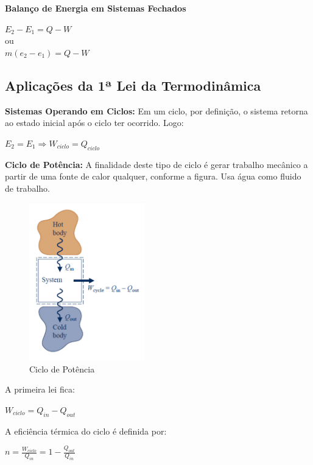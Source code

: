 \documentclass[a4paper, 12pt]{article}
\begin{document}
\textbf{Balanço de Energia em Sistemas Fechados}
	\begin{center}
		\large 
		$ E_{2} - E_{1} = Q - W $\\ ou\\
		$ m(e_{2} - e_{1}) = Q - W$
	\end{center}

\subsection{Aplicações da 1ª Lei da Termodinâmica}
\textbf{Sistemas Operando em Ciclos:}
Em um ciclo, por definição, o sistema retorna ao estado inicial após o ciclo ter
ocorrido. Logo:
	\begin{center}
		\large
		$ E_{2} = E_{1} \Rightarrow W_{ciclo} = Q_{ciclo}$
	\end{center}

\textbf{Ciclo de Potência:} A finalidade deste tipo de ciclo é gerar trabalho
mecânico a partir de uma fonte de calor qualquer,
conforme a figura. Usa água como fluido de trabalho.
	\begin{figure}[h]
		\includegraphics[width = 5cm]{cp.png}
		\centering
		\caption{Ciclo de Potência}
	\end{figure}

A primeira lei fica:
	\begin{center}
		\large
		$ W_{ciclo}  = Q_{in} - Q_{out}$
	\end{center}

A eficiência térmica do ciclo é definida por:
	\begin{center}
		\large
		$ n = \frac{W_{ciclo}}{Q_{in}} = 1 - \frac{Q_{out}}{Q_{in}} $
	\end{center}
\end{document}
